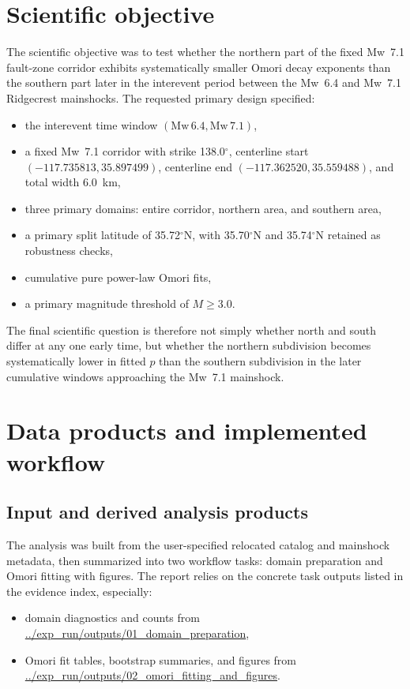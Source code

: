 \documentclass[11pt]{article}
\begin{document}
\section{Scientific objective}
The scientific objective was to test whether the northern part of the fixed Mw~7.1 fault-zone corridor exhibits systematically smaller Omori decay exponents than the southern part later in the interevent period between the Mw~6.4 and Mw~7.1 Ridgecrest mainshocks. The requested primary design specified:
\begin{itemize}[leftmargin=2em]
    \item the interevent time window $(\mathrm{Mw}\,6.4,\mathrm{Mw}\,7.1)$,
    \item a fixed Mw~7.1 corridor with strike 138.0$^{\circ}$, centerline start $(-117.735813,35.897499)$, centerline end $(-117.362520,35.559488)$, and total width 6.0~km,
    \item three primary domains: entire corridor, northern area, and southern area,
    \item a primary split latitude of 35.72$^{\circ}$N, with 35.70$^{\circ}$N and 35.74$^{\circ}$N retained as robustness checks,
    \item cumulative pure power-law Omori fits,
    \item a primary magnitude threshold of $M \geq 3.0$.
\end{itemize}
The final scientific question is therefore not simply whether north and south differ at any one early time, but whether the northern subdivision becomes systematically lower in fitted $p$ than the southern subdivision in the later cumulative windows approaching the Mw~7.1 mainshock.

\section{Data products and implemented workflow}
\subsection{Input and derived analysis products}
The analysis was built from the user-specified relocated catalog and mainshock metadata, then summarized into two workflow tasks: domain preparation and Omori fitting with figures. The report relies on the concrete task outputs listed in the evidence index, especially:
\begin{itemize}[leftmargin=2em]
    \item domain diagnostics and counts from
    \url{../exp_run/outputs/01_domain_preparation},
    \item Omori fit tables, bootstrap summaries, and figures from
    \url{../exp_run/outputs/02_omori_fitting_and_figures}.
\end{itemize}
\end{document}
